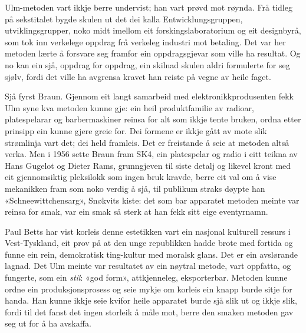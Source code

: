 Ulm-metoden vart ikkje berre undervist; han vart prøvd mot røynda. Frå tidleg på sekstitalet bygde skulen ut det dei kalla Entwicklungsgruppen, utviklingsgrupper, noko midt imellom eit forskingslaboratorium og eit designbyrå, som tok inn verkelege oppdrag frå verkeleg industri mot betaling. Det var her metoden lærte å forsvare seg framfor ein oppdragsgjevar som ville ha resultat. Og no kan ein sjå, oppdrag for oppdrag, ein skilnad skulen aldri formulerte for seg sjølv, fordi det ville ha avgrensa kravet han reiste på vegne av heile faget.

Sjå fyrst Braun. Gjennom eit langt samarbeid med elektronikkprodusenten fekk Ulm syne kva metoden kunne gje: ein heil produktfamilie av radioar, platespelarar og barbermaskiner reinsa for alt som ikkje tente bruken, ordna etter prinsipp ein kunne gjere greie for. Dei formene er ikkje gått av mote slik strømlinja vart det; dei held framleis. Det er freistande å seie at metoden altså verka. Men i 1956 sette Braun fram SK4, ein platespelar og radio i eitt teikna av Hans Gugelot og Dieter Rams, grunngjeven til siste detalj og likevel kront med eit gjennomsiktig pleksilokk som ingen bruk kravde, berre eit val om å vise mekanikken fram som noko verdig å sjå, til publikum straks døypte han «Schneewittchensarg», Snøkvits kiste: det som bar apparatet metoden meinte var reinsa for smak, var ein smak så sterk at han fekk sitt eige eventyrnamn.

Paul Betts har vist korleis denne estetikken vart ein nasjonal kulturell ressurs i Vest-Tyskland, eit prov på at den unge republikken hadde brote med fortida og funne ein rein, demokratisk ting-kultur med moralsk glans\autocite{betts2004}. Det er ein avslørande lagnad. Det Ulm meinte var resultatet av ein nøytral metode, vart oppfatta, og fungerte, som ein \emph{stil}: «god form», attkjenneleg, eksporterbar. Metoden kunne ordne ein produksjonsprosess og seie mykje om korleis ein knapp burde sitje for handa. Han kunne ikkje seie kvifor heile apparatet burde sjå slik ut og ikkje slik, fordi til det fanst det ingen storleik å måle mot, berre den smaken metoden gav seg ut for å ha avskaffa.

